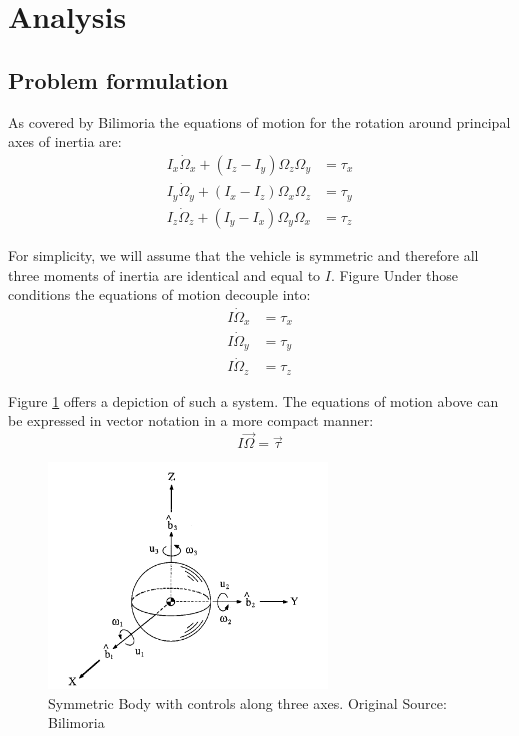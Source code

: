 \section{Analysis}

\subsection{Problem formulation}
As covered by Bilimoria the equations of motion for the rotation around principal axes of inertia are:
\begin{align}
I_x \dot{\Omega}_x + (I_z-I_y) \Omega_z \Omega_y &= \tau_x \\
I_y \dot{\Omega}_y + (I_x-I_z) \Omega_x \Omega_z &= \tau_y \\
I_z \dot{\Omega}_z + (I_y-I_x) \Omega_y \Omega_x &= \tau_z 
\end{align}

For simplicity, we will assume that the vehicle is symmetric and therefore all three moments of inertia are identical and equal to $I$. Figure Under those conditions the equations of motion decouple into:
\begin{align}
I \dot{\Omega}_x &= \tau_x \\
I \dot{\Omega}_y &= \tau_y \\
I \dot{\Omega}_z &= \tau_z 
\end{align}

Figure \ref{fig:symmetricBody} offers a depiction of such a system. The equations of motion above can be expressed in vector notation in a more compact manner:
\begin{equation}
I \vec{\Omega} = \vec{\tau}
\end{equation}

\begin{figure}[h]
	\centering
	\includegraphics[height=6cm,keepaspectratio]{media/BilimoriaSymmetricBodyModel.png}
	\caption{Symmetric Body with controls along three axes. Original Source: Bilimoria \cite{bilimoria1993time}}
	\label{fig:symmetricBody}
\end{figure}

